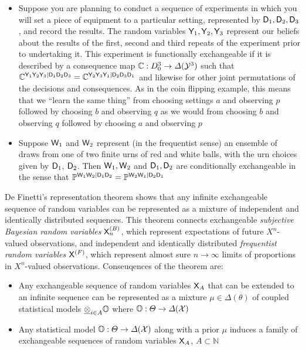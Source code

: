 \begin{itemize}
    \item Suppose you are planning to conduct a sequence of experiments in which you will set a piece of equipment to a particular setting, represented by $\mathsf{D}_1,\mathsf{D}_2,\mathsf{D}_3$, and record the results. The random variables $\mathsf{Y}_1,\mathsf{Y}_2,\mathsf{Y}_3$ represent our beliefs about the results of the first, second and third repeats of the experiment prior to undertaking it. This experiment is functionally exchangeable if it is described by a consequence map $\mathbb{C}:D_0^3\to \Delta(\mathcal{Y}^3)$ such that $\mathbb{C}^{\mathsf{Y}_1\mathsf{Y}_2\mathsf{Y}_3|\mathsf{D}_1\mathsf{D}_2\mathsf{D}_3}=\mathbb{C}^{\mathsf{Y}_2\mathsf{Y}_3\mathsf{Y}_1|\mathsf{D}_2\mathsf{D}_3\mathsf{D}_1}$ and likewise for other joint permutations of the decisions and consequences. As in the coin flipping example, this means that we ``learn the same thing'' from choosing settings $a$ and observing $p$ followed by choosing $b$ and observing $q$ as we would from choosing $b$ and observing $q$ followed by choosing $a$ and observing $p$
    \item Suppose $\mathsf{W}_1$ and $\mathsf{W}_2$ represent (in the frequentist sense) an ensemble of draws from one of two finite urns of red and white balls, with the urn choices given by $\mathsf{D}_1$, $\mathsf{D}_2$. Then $\mathsf{W}_1, \mathsf{W}_2$ and $\mathsf{D}_1, \mathsf{D}_2$ are conditionally exchangeable in the sense that $\mathbb{P}^{\mathsf{W}_1\mathsf{W}_2|\mathsf{D}_1\mathsf{D}_2}=\mathbb{P}^{\mathsf{W}_2\mathsf{W}_1|\mathsf{D}_2\mathsf{D}_1}$
\end{itemize}




De Finetti's representation theorem shows that any infinite exchangeable sequence of random variables can be represented as a mixture of independent and identically distributed sequences. This theorem connects exchangeable \emph{subjective Bayesian random variables} $\mathsf{X}^{(B)}_n$, which represent expectations of future $X^n$-valued observations, and independent and identically distributed \emph{frequentist random variables} $\mathsf{X}^{(F)}$, which represent almost sure $n\to\infty$ limits of proportions in $X^n$-valued observations. Conseuqences of the theorem are:

\begin{itemize}
    \item Any exchangeable sequence of random variables $\mathsf{X}_A$ that can be extended to an infinite sequence can be represented as a mixture $\mu\in\Delta(\theta)$ of coupled statistical models $\underline{\otimes}_{i\in A} \mathbb{O}$ where $\mathbb{O}:\Theta\to \Delta(\mathcal{X})$
    \item Any statistical model $\mathbb{O}:\Theta\to \Delta(\mathcal{X})$ along with a prior $\mu$ induces a family of exchangeable sequences of random variables $\mathsf{X}_A$, $A\subset\mathbb{N}$
\end{itemize}


